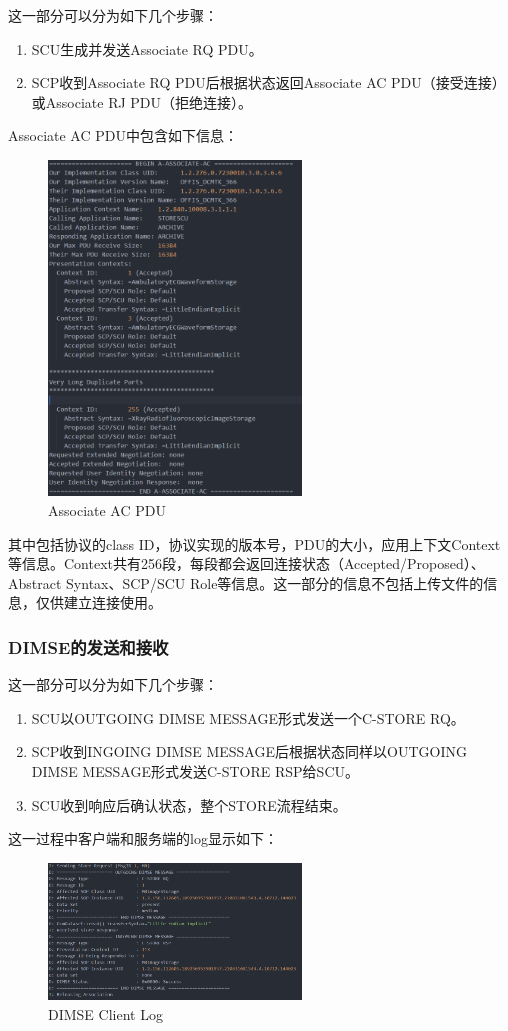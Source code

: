 \documentclass[UTF8]{ctexart}
\begin{document}
这一部分可以分为如下几个步骤：
\begin{enumerate}
    \item SCU生成并发送Associate RQ PDU。
    \item SCP收到Associate RQ PDU后根据状态返回Associate AC PDU（接受连接）或Associate RJ PDU（拒绝连接）。
\end{enumerate}
Associate AC PDU中包含如下信息：
\begin{figure}[H]
    \centering
    \includegraphics[width=0.6\textwidth]{PDU.png}
    \caption{Associate AC PDU}
    \label{fig: log PDU}
\end{figure}
其中包括协议的class ID，协议实现的版本号，PDU的大小，应用上下文Context等信息。Context共有256段，每段都会返回连接状态（Accepted/Proposed）、Abstract Syntax、SCP/SCU Role等信息。这一部分的信息不包括上传文件的信息，仅供建立连接使用。

\subsubsection{DIMSE的发送和接收}

这一部分可以分为如下几个步骤：
\begin{enumerate}
    \item SCU以OUTGOING DIMSE MESSAGE形式发送一个C-STORE RQ。
    \item SCP收到INGOING DIMSE MESSAGE后根据状态同样以OUTGOING DIMSE MESSAGE形式发送C-STORE RSP给SCU。
    \item SCU收到响应后确认状态，整个STORE流程结束。
\end{enumerate}
这一过程中客户端和服务端的log显示如下：
\begin{figure}[H]
    \centering
    \includegraphics[width=0.6\textwidth]{DIMSE client.png}
    \caption{DIMSE Client Log}
    \label{fig: log Client}
\end{figure}
\end{document}
